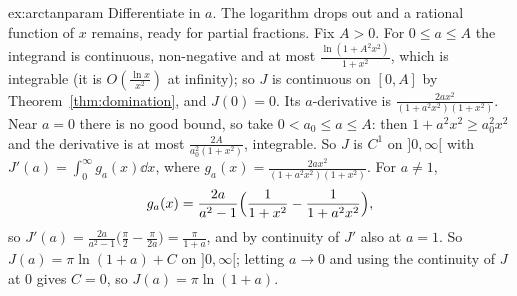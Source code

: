 \begin{solution}{ex:arctanparam}
\idea Differentiate in $a$. The logarithm drops out and a rational function of $x$ remains, ready for partial fractions.
\writeup Fix $A>0$. For $0\le a\le A$ the integrand is continuous, non-negative and at most $\frac{\ln(1+A^2x^2)}{1+x^2}$, which is
integrable (it is $O(\frac{\ln x}{x^2})$ at infinity); so $J$ is continuous on $[0,A]$ by Theorem~\ref{thm:domination}, and $J(0)=0$.
Its $a$-derivative is $\frac{2ax^2}{(1+a^2x^2)(1+x^2)}$. Near $a=0$ there is no good bound, so take $0<a_0\le a\le A$: then
$1+a^2x^2\ge a_0^2x^2$ and the derivative is at most $\frac{2A}{a_0^2(1+x^2)}$, integrable. So $J$ is $C^1$ on $]0,\infty[$ with
$J'(a)=\int_0^\infty g_a(x)\dd x$, where $g_a(x)=\frac{2ax^2}{(1+a^2x^2)(1+x^2)}$. For $a\ne1$,
\[
g_a(x)=\frac{2a}{a^2-1}\Bigl(\frac1{1+x^2}-\frac1{1+a^2x^2}\Bigr),
\]
so $J'(a)=\frac{2a}{a^2-1}\bigl(\frac\pi2-\frac\pi{2a}\bigr)=\frac\pi{1+a}$, and by continuity of $J'$ also at $a=1$. So $J(a)=\pi\ln(1+a)+C$ on
$]0,\infty[$; letting $a\to0$ and using the continuity of $J$ at $0$ gives $C=0$, so $J(a)=\pi\ln(1+a)$.
\end{solution}

